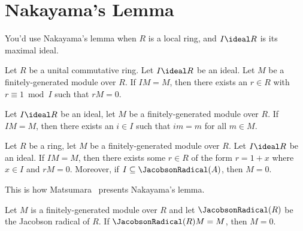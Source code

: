 \section{Nakayama's Lemma}

\begin{remark}
You'd use Nakayama's lemma when $R$ is a local ring, and $I\ideal R$
is its maximal ideal.
\end{remark}

\begin{proposition}
Let $R$ be a unital commutative ring. Let $I\ideal R$ be an ideal.
Let $M$ be a finitely-generated module over $R$.
If $IM=M$, then there exists an $r\in R$ with $r\equiv1\bmod{I}$
such that $rM=0$.
\end{proposition}

\begin{proposition}[$IM=M\implies im=m$]
Let $I\ideal R$ be an ideal, let $M$ be a finitely-generated module
over $R$.
If $IM=M$, then there exists an $i\in I$ such that $im=m$ for all
$m\in M$.
\end{proposition}

\begin{proposition}
Let $R$ be a ring, let $M$ be a finitely-generated module over $R$.
Let $I\ideal R$ be an ideal. If $IM=M$, then there exists some $r\in R$
of the form $r=1+x$ where $x\in I$ and $rM=0$. Moreover, if
$I\subset\JacobsonRadical(A)$, then $M=0$.
\end{proposition}

This is how Matsumara~\cite[1M]{matsumura1970commutative} presents
Nakayama's lemma.

\begin{proposition}
Let $M$ is a finitely-generated module over $R$ and
let $\JacobsonRadical(R)$ be the Jacobson radical of $R$.
If $\JacobsonRadical(R)M=M$, then $M=0$.
\end{proposition}